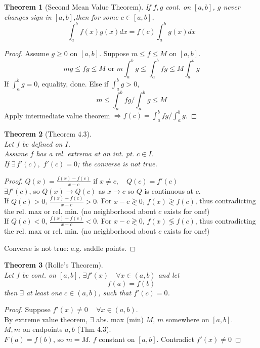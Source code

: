 \documentclass[twoside]{amsart}
\theoremstyle{plain}
\newtheorem{theorem}{Theorem}
\theoremstyle{definition}
\begin{document}
\begin{theorem}[Second Mean Value Theorem] If $f,g$ cont. on $[a,b]$, $g$ never changes sign in $[a,b]$,then for some $c \in [a,b]$, 
\[
\int_a^b f(x)g(x) dx = f(c) \int_a^b g(x) dx
\]
\end{theorem}
\begin{proof} Assume $g\geq 0$ on $[a,b]$.  Suppose $m\leq f \leq M$ on $[a,b]$.  
\[
m g \leq fg \leq M \text{ or } m \int_a^b g \leq \int_a^b fg \leq M \int_a^b g 
\]
If $\int_a^b g =0$, equality, done.  Else if $\int_a^b g > 0$, 
\[
m \leq \int_a^b fg / \int_a^b g \leq M
\]
Apply intermediate value theorem $\Longrightarrow f(c) = \int_a^b fg / \int_a^b g$.
\end{proof}
\begin{theorem}[Theorem 4.3] \quad \\
Let $f$ be defined on $I$.  \\
Assume $f$ has a rel. extrema at an int. pt. $c \in I$.  \\
If $\exists \, f'(c), \, \, f'(c) = 0$; the converse is not true.  
\end{theorem}
\begin{proof}
$  Q(x) = \frac{ f(x) - f(c) }{ x - c} $ if $ x \neq c, \quad Q(c) = f'(c)$ \\
$\exists f'(c)$, so $Q(x) \to Q(c)$ as $x \to c$ so $Q$ is continuous at $c$. \\ 
If $Q(c) > 0$, \quad $\frac{f(x) - f(c)}{ x-c } > 0 $.  For $x - c \gtrless 0$, \quad $f(x) \gtrless f(c)$, thus contradicting the rel. max or rel. min. (no neighborhood about $c$ exists for one!) \\
If $Q(c) < 0$, \quad $\frac{f(x) - f(c)}{ x-c } < 0 $.  For $x - c \gtrless 0$, \quad $f(x) \lessgtr f(c)$, thus contradicting the rel. max or rel. min. (no neighborhood about $c$ exists for one!) 

Converse is not true: e.g. saddle points.
\end{proof}

\begin{theorem}[Rolle's Theorem] \quad \\
Let $f$ be cont. on $[a,b]$, \quad $\exists f'(x) \quad \forall x \in (a,b)$ and let 
\[
f(a)=f(b)
\]
then $\exists$ at least one $c \in (a,b)$, such that $f'(c) = 0$.  
\end{theorem}

\begin{proof}
  Suppose $f'(x) \neq 0 \quad \, \forall x \in (a,b)$.  \\
  By extreme value theorem, $\exists$ abs. max (min) $M, \, m$ somewhere on $[a,b]$.   \\
  $M,m$ on endpoints $a,b$ (Thm 4.3).  \\
  $F(a) = f(b)$, so $m = M$.  $f$ constant on $[a,b]$.  
Contradict $f'(x) \neq 0$
\end{proof}
\end{document}
